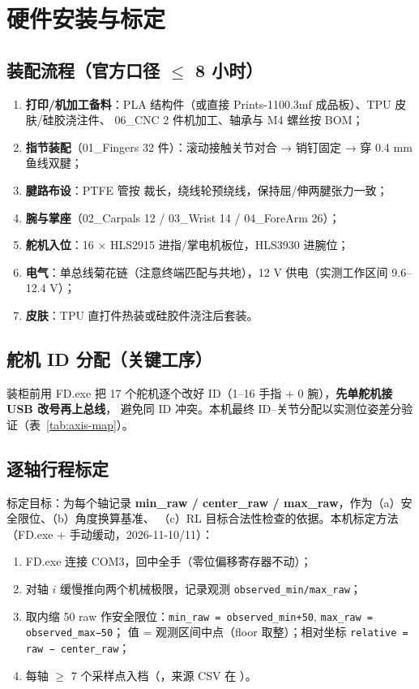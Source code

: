 \section{硬件安装与标定}

\subsection{装配流程（官方口径 $\le$ 8 小时）}
\begin{enumerate}
  \item \textbf{打印/机加工备料}：PLA 结构件（或直接 Prints-1100.3mf 成品板）、TPU 皮肤/硅胶浇注件、
        06\_CNC 2 件机加工、轴承与 M4 螺丝按 BOM；
  \item \textbf{指节装配}（01\_Fingers 32 件）：滚动接触关节对合 → 销钉固定 → 穿 0.4 mm 鱼线双腱；
  \item \textbf{腱路布设}：PTFE 管按  裁长，绕线轮预绕线，保持屈/伸两腱张力一致；
  \item \textbf{腕与掌座}（02\_Carpals 12 / 03\_Wrist 14 / 04\_ForeArm 26）；
  \item \textbf{舵机入位}：16 $\times$ HLS2915 进指/掌电机板位，HLS3930 进腕位；
  \item \textbf{电气}：单总线菊花链（注意终端匹配与共地），12 V 供电（实测工作区间 9.6--12.4 V）；
  \item \textbf{皮肤}：TPU 直打件热装或硅胶件浇注后套装。
\end{enumerate}

\subsection{舵机 ID 分配（关键工序）}
装柜前用 FD.exe 把 17 个舵机逐个改好 ID（1--16 手指 + 0 腕），\textbf{先单舵机接 USB 改号再上总线}，
避免同 ID 冲突。本机最终 ID--关节分配以实测位姿差分验证（表~\ref{tab:axis-map}）。

\subsection{逐轴行程标定}
标定目标：为每个轴记录 \textbf{min\_raw / center\_raw / max\_raw}，作为（a）安全限位、（b）角度换算基准、
（c）RL 目标合法性检查的依据。本机标定方法（FD.exe + 手动缓动，2026-11-10/11）：

\begin{enumerate}
  \item FD.exe 连接 COM3，回中全手（零位偏移寄存器不动）；
  \item 对轴 $i$ 缓慢推向两个机械极限，记录观测 \texttt{observed\_min/max\_raw}；
  \item 取内缩 50 raw 作安全限位：\texttt{min\_raw = observed\_min+50}, \texttt{max\_raw = observed\_max−50}；
  \center 值 = 观测区间中点（floor 取整）；相对坐标 \texttt{relative = raw − center\_raw}；
  \item 每轴 $\ge$ 7 个采样点入档（，来源 CSV 在 ）。
\end{enumerate}

